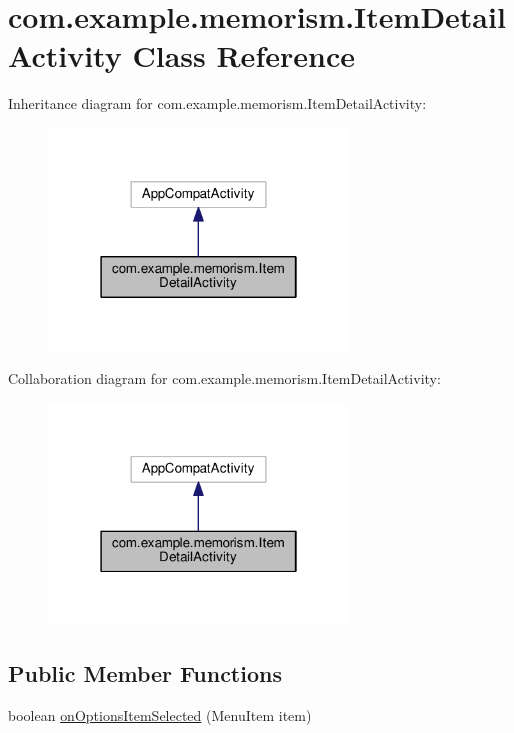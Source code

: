 \hypertarget{classcom_1_1example_1_1memorism_1_1_item_detail_activity}{}\section{com.\+example.\+memorism.\+Item\+Detail\+Activity Class Reference}
\label{classcom_1_1example_1_1memorism_1_1_item_detail_activity}


Inheritance diagram for com.\+example.\+memorism.\+Item\+Detail\+Activity\+:
\nopagebreak
\begin{figure}[H]
\begin{center}
\leavevmode
\includegraphics[width=226pt]{d6/d8a/classcom_1_1example_1_1memorism_1_1_item_detail_activity__inherit__graph}
\end{center}
\end{figure}


Collaboration diagram for com.\+example.\+memorism.\+Item\+Detail\+Activity\+:
\nopagebreak
\begin{figure}[H]
\begin{center}
\leavevmode
\includegraphics[width=226pt]{d8/deb/classcom_1_1example_1_1memorism_1_1_item_detail_activity__coll__graph}
\end{center}
\end{figure}
\subsection*{Public Member Functions}
\begin{DoxyCompactItemize}
\item 
boolean \hyperlink{classcom_1_1example_1_1memorism_1_1_item_detail_activity_af86a22f6772eb4109179456eeb1ecd4e}{on\+Options\+Item\+Selected} (Menu\+Item item)
\end{DoxyCompactItemize}
